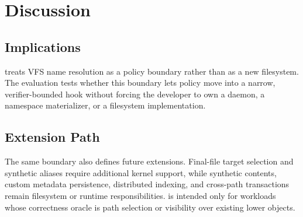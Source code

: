 \section{Discussion}
\label{sec:discussion}

\subsection{Implications}

\namei treats VFS name resolution as a policy boundary rather than as a new
filesystem. The evaluation tests whether this boundary lets policy move into a
narrow, verifier-bounded hook without forcing the
developer to own a daemon, a namespace materializer, or a filesystem
implementation.

\subsection{Extension Path}

The same boundary also defines future extensions. Final-file target selection
and synthetic aliases require additional kernel support, while synthetic
contents, custom metadata persistence, distributed indexing, and cross-path
transactions remain filesystem or runtime responsibilities. \namei is intended
only for workloads whose correctness oracle is path selection or visibility over
existing lower objects.
